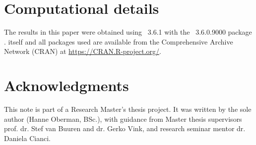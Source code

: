 \documentclass[article]{jss}
\begin{document}

\section*{Computational details}

The results in this paper were obtained using ~3.6.1 \cite{R} with the ~3.6.0.9000 package \cite{mice}.  itself and all packages used are available from the Comprehensive  Archive Network (CRAN) at \url{https://CRAN.R-project.org/}.


\section*{Acknowledgments}

This note is part of a Research Master's thesis project. It was written by the sole author (Hanne Oberman, BSc.), with guidance from Master thesis supervisors prof. dr. Stef van Buuren and dr. Gerko Vink, and research seminar mentor dr. Daniela Cianci. 







\newpage

\begin{appendix}

\end{appendix}

\end{document}
